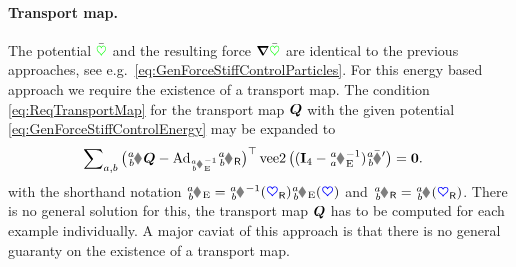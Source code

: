 \paragraph{Transport map.}
The potential $\bar{\textcolor{green}{\heartsuit}}$ and the resulting force $\boldsymbol{\nabla} \bar{\textcolor{green}{\heartsuit}}$ are identical to the previous approaches, see e.g.\ \eqref{eq:GenForceStiffControlParticles}.
For this energy based approach we require the existence of a transport map.
The condition \eqref{eq:ReqTransportMap} for the transport map $\boldsymbol{Q}$ with the given potential \eqref{eq:GenForceStiffControlEnergy} may be expanded to
\begin{align}
 \sumBodiesAB \big( \bodyJac{\BidxI}{\BidxII} \sysTransportMap - \Ad{\bodyHomoCoordE{\BidxI}{\BidxII}^{-1}} \bodyJacR{\BidxI}{\BidxII}\big)^\top \veeTwoOp\big((\idMat[4]-\bodyHomoCoordE{\BidxI}{\BidxI}^{-1})\bodyStiffMatCp{\BidxI}{\BidxII}\big) &= \tuple{0}.
\end{align}
with the shorthand notation $\bodyHomoCoordE{\BidxI}{\BidxII} = \bodyHomoCoord{\BidxI}{\BidxII}^{-1}(\sysCoordR) \bodyHomoCoordE{\BidxI}{\BidxII}(\sysCoord)$ and $\bodyJacR{\BidxI}{\BidxII} = \bodyJac{\BidxI}{\BidxII}(\sysCoordR)$.
There is no general solution for this, the transport map $\boldsymbol{Q}$ has to be computed for each example individually.
A major caviat of this approach is that there is no general guaranty on the existence of a transport map.


